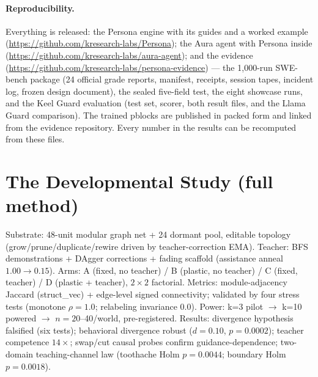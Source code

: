 \documentclass[11pt]{article}
\begin{document}
\paragraph{Reproducibility.} Everything is released: the Persona engine with its guides and a worked example (\url{https://github.com/kresearch-labs/Persona}); the Aura agent with Persona inside (\url{https://github.com/kresearch-labs/aura-agent}); and the evidence (\url{https://github.com/kresearch-labs/persona-evidence}) --- the 1{,}000-run SWE-bench package (24 official grade reports, manifest, receipts, session tapes, incident log, frozen design document), the sealed five-field test, the eight showcase runs, and the Keel Guard evaluation (test set, scorer, both result files, and the Llama Guard comparison). The trained pblocks are published in packed form and linked from the evidence repository. Every number in the results can be recomputed from these files.



\appendix

\section{The Developmental Study (full method)}
\label{app:dev}
Substrate: 48-unit modular graph net + 24 dormant pool, editable topology (grow/prune/duplicate/rewire driven by teacher-correction EMA). Teacher: BFS demonstrations + DAgger corrections + fading scaffold (assistance anneal $1.00\to0.15$). Arms: A (fixed, no teacher) / B (plastic, no teacher) / C (fixed, teacher) / D (plastic + teacher), $2\times2$ factorial. Metrics: module-adjacency Jaccard (struct\_vec) + edge-level signed connectivity; validated by four stress tests (monotone $\rho{=}1.0$; relabeling invariance 0.0). Power: k=3 pilot $\to$ k=10 powered $\to$ $n{=}20$--40/world, pre-registered. Results: divergence hypothesis falsified (six tests); behavioral divergence robust ($d{=}0.10$, $p{=}0.0002$); teacher competence $14\times$; swap/cut causal probes confirm guidance-dependence; two-domain teaching-channel law (toothache Holm $p{=}0.0044$; boundary Holm $p{=}0.0018$).
\end{document}
